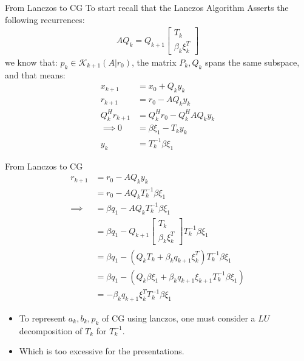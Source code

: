 \documentclass{beamer}
\begin{document}
    \begin{frame}{From Lanczos to CG}
        To start recall that the Lanczos Algorithm Asserts the following recurrences:
        \begin{align}
            AQ_k = Q_{k + 1} \begin{bmatrix}
                T_k
                \\
                \beta_k \xi_k^T
            \end{bmatrix}
        \end{align}
        we know that: $p_k \in \mathcal K_{k + 1}(A|r_0)$, the matrix $P_k, Q_k$ spans the same subspace, and that means: 
        \begin{align}
            x_{k + 1} &= x_0 + Q_ky_k
            \\
            r_{k + 1} &= r_0 - AQ_k y_k
            \\
            Q^H_kr_{k + 1} &= Q_k^H r_0 - Q_k^HAQ_k y_k
            \\
            \implies
            0 &= \beta\xi_1 - T_k y_k
            \\
            y_k &= T_k^{-1}\beta \xi_1
        \end{align}
    \end{frame}
    \begin{frame}{From Lanczos to CG}
        \begin{align}
            r_{k + 1} &= r_0 - AQ_k y_k
            \\
            &= r_0 - AQ_k T_k^{-1}\beta \xi_1
            \\
            \implies
            &= \beta q_1 - AQ_k T_k^{-1} \beta\xi_1
            \\
            &= \beta q_1 - Q_{k + 1}\begin{bmatrix}
                T_k \\ \beta_k \xi_k^T
            \end{bmatrix}T_k^{-1} \beta\xi_1
            \\
            &= \beta q_1 - 
            (Q_k T_k + \beta_k q_{k + 1}\xi_k^T)T_k^{-1} \beta\xi_1
            \\
            &= 
            \beta q_1 - (Q_k \beta \xi_1 + \beta_k q_{k + 1}\xi_{k + 1}T_k^{-1}\beta \xi_1)
            \\
            &= -\beta_k q_{k + 1}\xi_k^TT_k^{-1} \beta \xi_1
        \end{align}
        \begin{itemize}
            \item To represent $a_k, b_k, p_k$ of CG using lanczos, one must consider a $LU$ decomposition of $T_k$ for $T_k^{-1}$. 
            \item Which is too excessive for the presentations. 
        \end{itemize}
        
    \end{frame}
\end{document}
